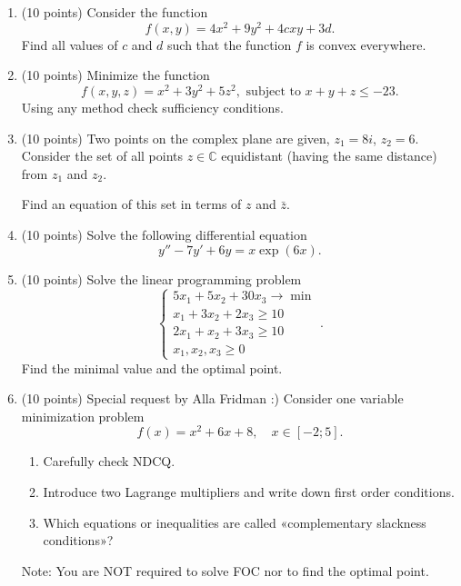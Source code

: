 \documentclass[12pt]{article} %
\theoremstyle{definition} %
\begin{document}
\begin{enumerate}

\item (10 points) Consider the function 
\[
f(x, y) = 4x^2 + 9y^2 + 4cxy + 3d.  
\]
Find all values of $c$ and $d$ such that the function $f$ is convex everywhere. 
\item (10 points) Minimize the function 
\[
f(x, y, z) = x^2 + 3y^2 + 5z^2, \text{ subject to } x + y + z \leq -23.
\]
Using any method check sufficiency conditions. 
\item (10 points) Two points on the complex plane are given, $z_1 = 8i$, $z_2 = 6$. 
Consider the set of all points $z\in \mathbb{C}$ equidistant (having the same distance) from $z_1$ and $z_2$. 

Find an equation of this set in terms of $z$ and $\bar z$. 

\item (10 points) Solve the following differential equation
\[
y''-7y' + 6y = x \exp(6x).
\]

\item (10 points) Solve the linear programming problem 
\[
\begin{cases}
  5x_1 + 5x_2 + 30x_3 \to \min \\
  x_1 + 3x_2 + 2x_3 \geq 10 \\
  2x_1 + x_2 + 3x_3 \geq 10 \\
  x_1, x_2, x_3 \geq 0
\end{cases}.
\]
Find the minimal value and the optimal point. 

\item (10 points)  Special request by Alla Fridman :)
Consider one variable minimization problem 
\[
f(x) = x^2 + 6x + 8, \quad x \in [-2; 5].  
\]

\begin{enumerate}
  \item Carefully check NDCQ. 
  \item Introduce two Lagrange multipliers and write down first order conditions. 
  \item Which equations or inequalities are called «complementary slackness conditions»?
\end{enumerate}

Note:   You are NOT required to solve FOC nor to find the optimal point. 



\end{enumerate}
\end{document}
